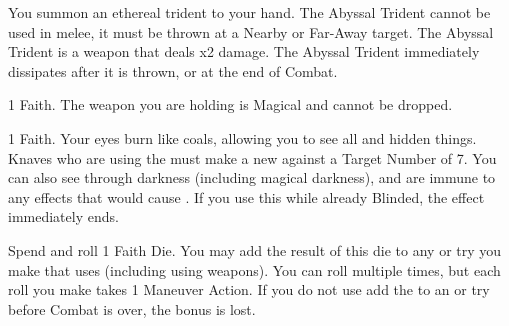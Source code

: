 \begin{multicols*}{2}


\LITURGY [
  Name = Abyssal Trident,
  Link = arcana-mystery-abyssal-trident,
  Paradigm = Cthonic,
  Duration=1 Maneuver Action
]

You summon an ethereal trident to your hand. The Abyssal Trident cannot be used in melee, it must be thrown at a Nearby or Far-Away target. The Abyssal Trident is a \FOC weapon that deals \DICE x2 damage. The Abyssal Trident immediately dissipates after it is thrown, or at the end of Combat. 

\LITURGY [
    Name=Blessed Blade,
    Link= arcana-mystery-blessed-blade,
    Paradigm = Righteous,
    Duration=1 Maneuver Action
]

 1 Faith. The weapon you are holding is Magical and cannot be dropped.

\LITURGY [
  Name = Eye of Flame,
  Link = arcana-mystery-eye-of-flame,
  Paradigm = Righteous,
  Duration=1 Maneuver Action
]

 1 Faith. Your eyes burn like coals, allowing you to see all  and hidden things. Knaves who are using the  must make a new  against a Target Number of 7. You can also see through darkness (including magical darkness), and are immune to any effects that would cause . If you use this while already Blinded, the effect immediately ends.




\LITURGY [
  Name = Great Strength,
  Link = arcana-mystery-great-strength,
  Paradigm = Errant,
  Duration=1 Maneuver Action
]

Spend  and roll 1 Faith Die. You may add the result of this die to any \RO or \RB try you make that uses \VIG (including using \VIG weapons). You can roll multiple times, but each roll you make takes 1 Maneuver Action. If you do not use add the \SUMDICE to an \RO or \RB try before Combat is over, the bonus is lost.


\end{multicols*}

